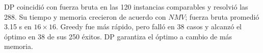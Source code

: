 DP coincidió con fuerza bruta en las 120 instancias comparables y resolvió
las 288. Su tiempo y memoria crecieron de acuerdo con $NMV$; fuerza bruta
promedió 3.15 s en $16\times16$. Greedy fue más rápido, pero falló en 38
casos y alcanzó el óptimo en 38 de sus 250 éxitos. DP garantiza el óptimo
a cambio de más memoria.
